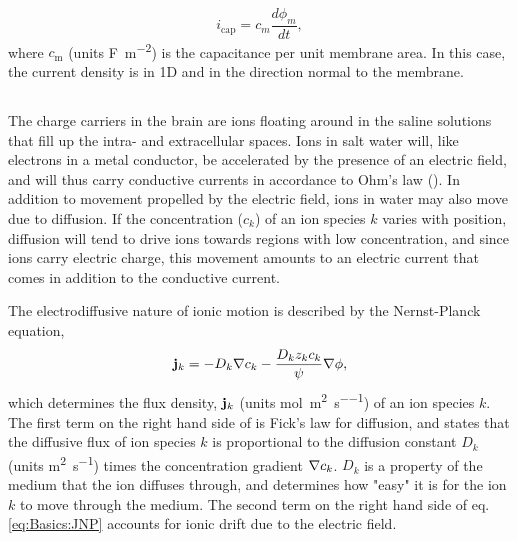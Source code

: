 \begin{equation}
i_\text{cap} = c_m\frac{d\phi_m}{dt},
\label{eq:Basics:Icap_mem}
\end{equation}
where $c_\text{m}$ (units \si{\farad\per\square\metre}) is the capacitance per unit membrane area. In this case, the current density is in 1D and in the direction normal to the membrane.


\subsection{}
\label{sec:Basics:DiffusiveCurrent}
 
The charge carriers in the brain are ions floating around in the saline solutions that fill up the intra- and extracellular spaces. Ions in salt water will, like electrons in a metal conductor, be accelerated by the presence of an electric field, and will thus carry conductive currents in accordance to Ohm's law ().
In addition to movement propelled by the electric field, ions in water may also move due to diffusion. If the concentration ($c_k$) of an ion species $k$ varies with position, diffusion will tend to drive ions towards regions with low concentration, and since ions carry electric charge, this movement amounts to an electric current that comes in addition to the conductive current. 

The electrodiffusive  nature of ionic motion is described by the Nernst-Planck equation,
\begin{equation}
{\bf j}_k = - D_k {\bf \nabla} c_{k} - \frac{D_k z_k c_k}{\psi} {\bf \nabla} \phi,
\label{eq:Basics:JNP}
\end{equation}
which determines the flux density, ${\bf j}_k$ (units \si{\mole\per\square\metre\per\second}) of an ion species $k$. The first term on the right hand side of  is Fick's law for diffusion, and states that the diffusive flux of ion species $k$ is proportional to the diffusion constant ${D}_k$ (units \si{\square\metre\per\second}) times the concentration gradient ${\bf \nabla} c_{k}$. ${D}_k$ is a property of the medium that the ion diffuses through, and determines how "easy" it is for the ion $k$ to move through the medium. The second term on the right hand side of eq. \ref{eq:Basics:JNP} accounts for ionic drift due to the electric field. 

